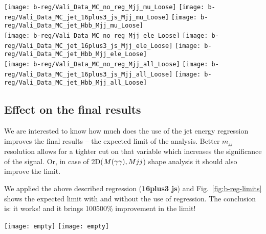 \begin{figure*}[thb]
  \centering
  \texttt{[image: b-reg/Vali\_Data\_MC\_no\_reg\_Mjj\_mu\_Loose]}\hfil
  \texttt{[image: b-reg/Vali\_Data\_MC\_jet\_16plus3\_js\_Mjj\_mu\_Loose]}\hfil
  \texttt{[image: b-reg/Vali\_Data\_MC\_jet\_Hbb\_Mjj\_mu\_Loose]}\hfil\\
  \texttt{[image: b-reg/Vali\_Data\_MC\_no\_reg\_Mjj\_ele\_Loose]}\hfil
  \texttt{[image: b-reg/Vali\_Data\_MC\_jet\_16plus3\_js\_Mjj\_ele\_Loose]}\hfil
  \texttt{[image: b-reg/Vali\_Data\_MC\_jet\_Hbb\_Mjj\_ele\_Loose]}\hfil\\
  \texttt{[image: b-reg/Vali\_Data\_MC\_no\_reg\_Mjj\_all\_Loose]}\hfil
  \texttt{[image: b-reg/Vali\_Data\_MC\_jet\_16plus3\_js\_Mjj\_all\_Loose]}\hfil
  \texttt{[image: b-reg/Vali\_Data\_MC\_jet\_Hbb\_Mjj\_all\_Loose]}\hfil\\
  \caption{Distributions of the $m_{jj}$. On the left
    are plots with no regression, in the center - using
    \textbf{16plus3 js} training and on the right - using \textbf{Hbb}
    regression.  Top plots for muon channel, middle for electron
    channel and bottom is the combination (sum) of the two.  }
  \label{fig:vali-Mjj}
\end{figure*}



\subsection{Effect on the final results}
We are interested to know how much does the use of the jet energy
regression improves the final results -- the expected limit of the
analysis. Better $m_{jj}$ resolution allows for a tighter cut on that
variable which increases the significance of the signal. Or, in case of
2D($M(\gamma\gamma), Mjj$) shape analysis it should also improve the limit.

We applied the above described regression (\textbf{16plus3 js}) and
Fig.~\ref{fig:b-reg-limits} shows the expected limit with and without
the use of regression.  The conclusion is: it works! and it brings
100500\% improvement in the limit!

\begin{figure*}[thb]
  \centering
  \texttt{[image: empty]}\hfil
  \texttt{[image: empty]}\hfil
  \caption{Expected limit without using b-jet energy regression (left)
    and with the regression (right).}
  \label{fig:b-reg-limits}
\end{figure*}


